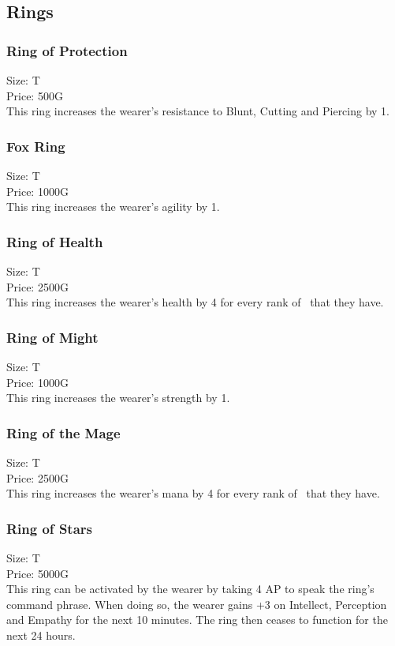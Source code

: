 \subsection{Rings}\label{subsec:rings}

\subsubsection{Ring of Protection}\label{item:ringOfProtection}
Size: T\\
Price: 500G\\
This ring increases the wearer's resistance to Blunt, Cutting and Piercing by 1.

\subsubsection{Fox Ring}\label{item:ringOfFox}
Size: T\\
Price: 1000G\\
This ring increases the wearer's agility by 1.

\subsubsection{Ring of Health}\label{item:ringOfHealth}
Size: T\\
Price: 2500G\\
This ring increases the wearer's health by 4 for every rank of~ that they have.

\subsubsection{Ring of Might}\label{item:ringOfMight}
Size: T\\
Price: 1000G\\
This ring increases the wearer's strength by 1.

\subsubsection{Ring of the Mage}\label{item:ringOfMage}
Size: T\\
Price: 2500G\\
This ring increases the wearer's mana by 4 for every rank of~ that they have.

\subsubsection{Ring of Stars}\label{item:ringOfStars}
Size: T\\
Price: 5000G\\
This ring can be activated by the wearer by taking 4 AP to speak the ring's command phrase.
When doing so, the wearer gains +3 on Intellect, Perception and Empathy for the next 10 minutes.
The ring then ceases to function for the next 24 hours.